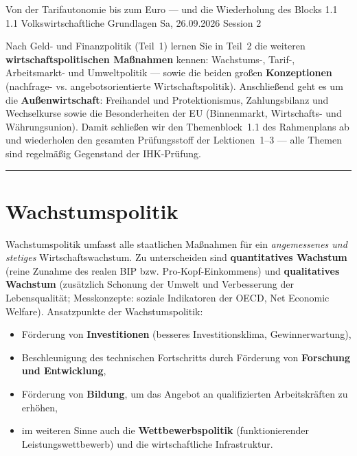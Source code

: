 \documentclass[11pt, a4paper]{article}
\begin{document}
%
  {Von der Tarifautonomie bis zum Euro --- und die Wiederholung des Blocks 1.1}%
  {1.1 Volkswirtschaftliche Grundlagen}%
  {Sa, 26.09.2026 \textperiodcentered{} Session 2}

\begin{merksatz}[title={\bfseries Worum geht es in diesem Teil?}]
Nach Geld- und Finanzpolitik (Teil~1) lernen Sie in Teil~2 die weiteren
\textbf{wirtschaftspolitischen Maßnahmen} kennen: Wachstums-, Tarif-, Arbeitsmarkt- und
Umweltpolitik --- sowie die beiden großen \textbf{Konzeptionen} (nachfrage- vs.
angebotsorientierte Wirtschaftspolitik). Anschließend geht es um die
\textbf{Außenwirtschaft}: Freihandel und Protektionismus, Zahlungsbilanz und
Wechselkurse sowie die Besonderheiten der EU (Binnenmarkt, Wirtschafts- und
Währungsunion). Damit schließen wir den Themenblock~1.1
des Rahmenplans ab und wiederholen den gesamten Prüfungsstoff der Lektionen~1--3 ---
alle Themen sind regelmäßig Gegenstand der IHK-Prüfung.
\end{merksatz}

\tableofcontents
\vspace{1em}
\hrule
\vspace{1em}

\section{Wachstumspolitik}

Wachstumspolitik umfasst alle staatlichen Maßnahmen für ein \emph{angemessenes und
stetiges} Wirtschaftswachstum. Zu unterscheiden sind \textbf{quantitatives Wachstum}
(reine Zunahme des realen BIP bzw. Pro-Kopf-Einkommens) und \textbf{qualitatives Wachstum}
(zusätzlich Schonung der Umwelt und Verbesserung der Lebensqualität; Messkonzepte: soziale
Indikatoren der OECD, Net Economic Welfare). Ansatzpunkte der Wachstumspolitik:

\begin{itemize}
  \item Förderung von \textbf{Investitionen} (besseres Investitionsklima, Gewinnerwartung),
  \item Beschleunigung des technischen Fortschritts durch Förderung von
    \textbf{Forschung und Entwicklung},
  \item Förderung von \textbf{Bildung}, um das Angebot an qualifizierten Arbeitskräften zu
    erhöhen,
  \item im weiteren Sinne auch die \textbf{Wettbewerbspolitik} (funktionierender
    Leistungswettbewerb) und die wirtschaftliche Infrastruktur.
\end{itemize}
\end{document}
